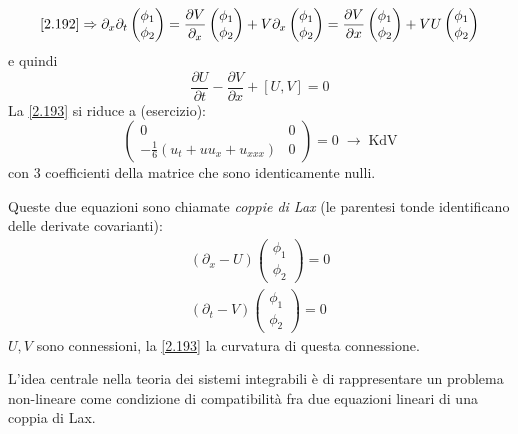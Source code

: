 \documentclass[a4paper,11pt]{report}
\begin{document}
\[
\eqref{2.192} \Rightarrow \partial_x\partial_t\left(\begin{matrix}
\phi_1 \\
\phi_2
\end{matrix} \right)=\frac{\partial V}{\partial_x}\left(\begin{matrix}
\phi_1 \\
\phi_2
\end{matrix} \right) + V\partial_x \left(\begin{matrix}
\phi_1 \\
\phi_2
\end{matrix} \right) =\frac{\partial V}{\partial x}\left(\begin{matrix}
\phi_1 \\
\phi_2
\end{matrix} \right) + VU \left(\begin{matrix}
\phi_1 \\
\phi_2
\end{matrix} \right)
\]
e quindi
\begin{equation}
\frac{\partial U}{\partial t} - \frac{\partial V}{\partial x} + \left[U,V\right]=0
\label{2.193}
\end{equation}
La \eqref{2.193} si riduce a (esercizio):
\[
\left(\begin{matrix}
0 & 0 \\
-\frac{1}{6}\left(u_t + u u_x + u_{xxx}\right) & 0
\end{matrix} \right) = 0 \;\rightarrow\; \text{KdV}
\]
con 3 coefficienti della matrice che sono identicamente nulli.

\medskip

Queste due equazioni sono chiamate \emph{coppie di Lax} (le parentesi tonde identificano delle derivate covarianti):
\[
\begin{matrix}
\left(\partial_x - U \right)\left(\begin{matrix}
\phi_1 \\
\phi_2
\end{matrix} \right) =0 \\
\left(\partial_t - V \right)\left(\begin{matrix}
\phi_1 \\
\phi_2
\end{matrix} \right) = 0
\end{matrix}
\]
$U,V$ sono connessioni, la \eqref{2.193} la curvatura di questa connessione. %

\medskip

L'idea centrale nella teoria dei sistemi integrabili \`e di rappresentare un problema non-lineare come condizione di compatibilit\`a fra due equazioni lineari di una coppia di Lax.
\end{document}
